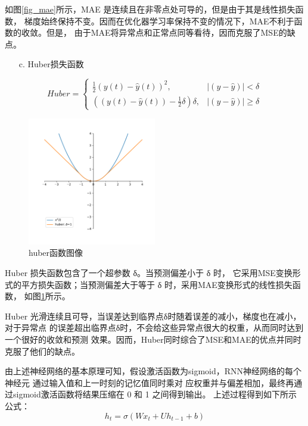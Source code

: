\documentclass[AutoFakeBold]{LZUThesis}
\begin{document}
如图\ref{fig_mae}所示，MAE 是连续且在非零点处可导的，但是由于其是线性损失函数，
梯度始终保持不变。因而在优化器学习率保持不变的情况下，MAE不利于函数的收敛。但是，
由于MAE将异常点和正常点同等看待，因而克服了MSE的缺点。

\begin{itemize}
    \item[c. ] Huber损失函数
\end{itemize}

$$
Huber=
\left\{\begin{matrix}
    \frac{1}{2}(y\left(t\right) - \hat{y}\left(t\right))^{2}, & \left | (y - \hat{y})  \right | < \delta\\
    ((y\left(t\right) - \hat{y}\left(t\right)) - \frac1 2 \delta)\delta, & \left | (y - \hat{y})  \right | \geq \delta
\end{matrix}\right.
$$

\begin{figure}[H]
	\centering
    \includegraphics[width=0.5\textwidth]{figures/huber.pdf}
    \caption{huber函数图像}
    \label{fig_huber}
\end{figure}

Huber 损失函数包含了一个超参数 δ。当预测偏差小于 δ 时，
它采用MSE变换形式的平方损失函数；当预测偏差大于等于 δ 时，采用MAE变换形式的线性损失函数，
如图\ref{fig_huber}所示。

Huber 光滑连续且可导，当误差达到临界点δ时随着误差的减小，梯度也在减小，对于异常点
的误差超出临界点δ时，不会给这些异常点很大的权重，从而同时达到一个很好的收敛和预测
效果。因而，Huber同时综合了MSE和MAE的优点并同时克服了他们的缺点。

由上述神经网络的基本原理可知，假设激活函数为sigmoid，RNN神经网络的每个神经元
通过输入值和上一时刻的记忆值同时乘对
应权重并与偏差相加，最终再通过sigmoid激活函数将结果压缩在 0 和 1 之间得到输出。
上述过程得到如下所示公式：
$$h_t=\sigma(Wx_t+Uh_{t-1}+b)$$
\end{document}
